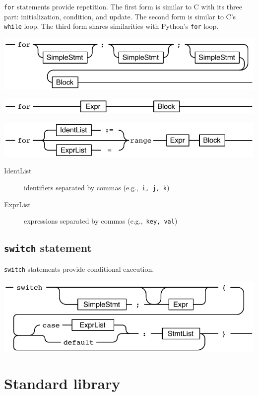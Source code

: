 \documentclass{article}
\begin{document}
\begin{multicols*}{3}
  \lstinline{for} statements provide repetition.
  The first form is similar to C with its three part: initialization, condition, and update.
  The second form is similar to C's \texttt{while} loop.
  The third form shares similarities with Python's \lstinline{for} loop.

  \includegraphics[width=\linewidth]{for-3parts}

  \includegraphics[width=\linewidth]{for-1cond}

  \includegraphics[width=\linewidth]{for-range}

  \begin{description}
  \item[IdentList] identifiers separated by commas (e.g.,~\lstinline{i, j, k})
  \item[ExprList] expressions separated by commas (e.g.,~\lstinline{key, val})
  \end{description}

  \filbreak
  \subsection*{\lstinline{switch} statement}

  \lstinline{switch} statements provide conditional execution.

  \includegraphics[width=\linewidth]{switch-expr}

  \filbreak
  \section*{Standard library}


\end{multicols*}
\end{document}
